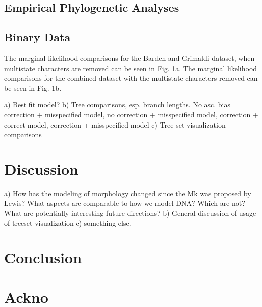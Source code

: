 \documentclass[]{article}
\begin{document}
\subsection{Empirical Phylogenetic Analyses}
\subsection{Binary Data}

The marginal likelihood comparisons for the Barden and Grimaldi dataset, when multistate characters are removed can be seen in Fig. 1a.
The marginal likelihood comparisons for the combined dataset with the multistate characters removed can be seen in Fig. 1b.




	a) Best fit model?
	b) Tree comparisons, esp. branch lengths. No asc. bias correction + misspecified model, no correction + misspecified model, correction + correct model, correction + misspecified model 
	c) Tree set visualization comparisons
	
\section{Discussion}	

	a) How has the modeling of morphology changed since the Mk was proposed by Lewis? What aspects are comparable to how we model DNA? Which are not? What are potentially interesting future directions? 
	b) General discussion of usage of treeset visualization
	c) something else.

\section{Conclusion}	


\section{Ackno}	
\end{document}

